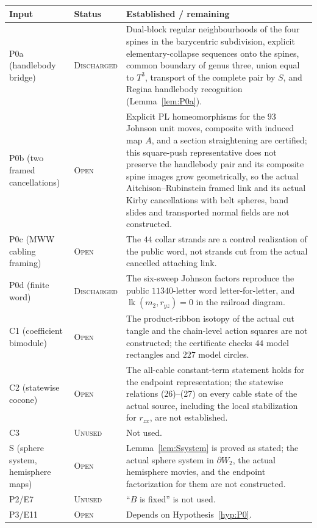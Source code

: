 \documentclass[11pt]{amsart}
\theoremstyle{definition}
\theoremstyle{remark}
\newcommand{\Open}{\textnormal{\textsc{Open}}}
\newcommand{\Discharged}{\textnormal{\textsc{Discharged}}}
\newcommand{\Unused}{\textnormal{\textsc{Unused}}}
\begin{document}
\begin{center}
\small
\begin{tabularx}{\textwidth}{@{}l l X@{}}
\toprule
Input & Status & Established / remaining \\
\midrule
P0a (handlebody bridge) & \Discharged & Dual-block regular neighbourhoods of the four spines in the barycentric subdivision, explicit elementary-collapse sequences onto the spines, common boundary of genus three, union equal to $T^3$, transport of the complete pair by $S$, and Regina handlebody recognition (Lemma~\ref{lem:P0a}). \\
P0b (two framed cancellations) & \Open & Explicit PL homeomorphisms for the $93$ Johnson unit moves, composite with induced map $A$, and a section straightening are certified; this square-push representative does not preserve the handlebody pair and its composite spine images grow geometrically, so the actual Aitchison--Rubinstein framed link and its actual Kirby cancellations with belt spheres, band slides and transported normal fields are not constructed. \\
P0c (MWW cabling framing) & \Open & The $44$ collar strands are a control realization of the public word, not strands cut from the actual cancelled attaching link. \\
P0d (finite word) & \Discharged & The six-sweep Johnson factors reproduce the public $11340$-letter word letter-for-letter, and $\operatorname{lk}(m_2,r_{yz})=0$ in the railroad diagram. \\
C1 (coefficient bimodule) & \Open & The product-ribbon isotopy of the actual cut tangle and the chain-level action squares are not constructed; the certificate checks $44$ model rectangles and $227$ model circles. \\
C2 (statewise cocone) & \Open & The all-cable constant-term statement holds for the endpoint representation; the statewise relations (26)--(27) on every cable state of the actual source, including the local stabilization for $r_{zx}$, are not established. \\
C3 & \Unused & Not used. \\
S (sphere system, hemisphere maps) & \Open & Lemma~\ref{lem:Ssystem} is proved as stated; the actual sphere system in $\partial W_2$, the actual hemisphere movies, and the endpoint factorization for them are not constructed. \\
P2/E7 & \Unused & ``$B$ is fixed'' is not used. \\
P3/E11 & \Open & Depends on Hypothesis~\ref{hyp:P0}. \\

\end{tabularx}
\end{center}
\end{document}
